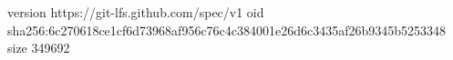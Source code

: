 version https://git-lfs.github.com/spec/v1
oid sha256:6c270618ce1cf6d73968af956c76c4c384001e26d6c3435af26b9345b5253348
size 349692
